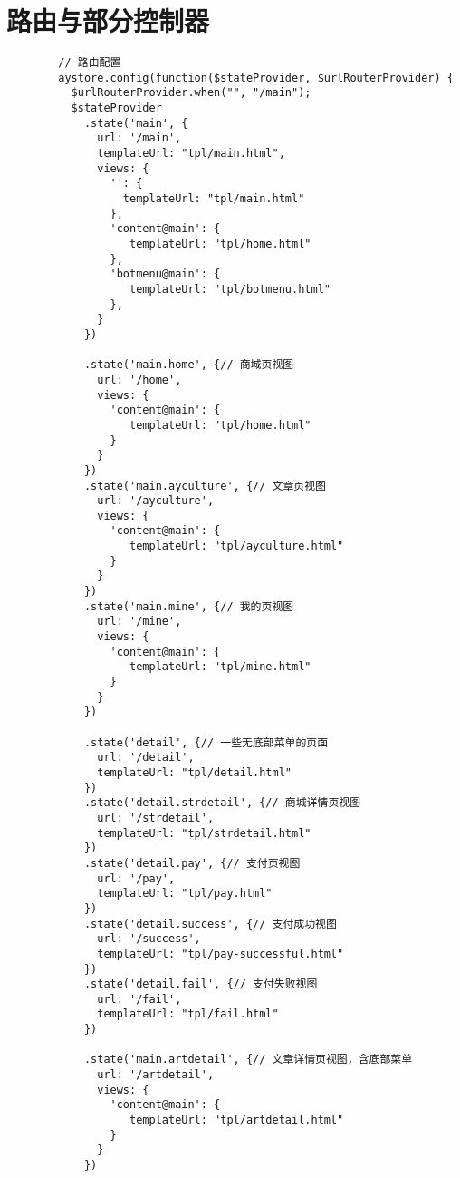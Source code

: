 
\thesisappendix
  \section{路由与部分控制器}
    \label{sec:控制器与路由部分}
      \begin{lstlisting}
        // 路由配置
        aystore.config(function($stateProvider, $urlRouterProvider) {
          $urlRouterProvider.when("", "/main");
          $stateProvider
            .state('main', {
              url: '/main',
              templateUrl: "tpl/main.html",
              views: {
                '': {
                  templateUrl: "tpl/main.html"
                },
                'content@main': {
                   templateUrl: "tpl/home.html"
                },
                'botmenu@main': {
                   templateUrl: "tpl/botmenu.html"
                },
              }
            })

            .state('main.home', {// 商城页视图
              url: '/home',
              views: {
                'content@main': {
                   templateUrl: "tpl/home.html"
                }
              }
            })
            .state('main.ayculture', {// 文章页视图
              url: '/ayculture',
              views: {
                'content@main': {
                   templateUrl: "tpl/ayculture.html"
                }
              }
            })
            .state('main.mine', {// 我的页视图
              url: '/mine',
              views: {
                'content@main': {
                   templateUrl: "tpl/mine.html"
                }
              }
            })

            .state('detail', {// 一些无底部菜单的页面
              url: '/detail',
              templateUrl: "tpl/detail.html"
            })
            .state('detail.strdetail', {// 商城详情页视图
              url: '/strdetail',
              templateUrl: "tpl/strdetail.html"
            })
            .state('detail.pay', {// 支付页视图
              url: '/pay',
              templateUrl: "tpl/pay.html"
            })
            .state('detail.success', {// 支付成功视图
              url: '/success',
              templateUrl: "tpl/pay-successful.html"
            })
            .state('detail.fail', {// 支付失败视图
              url: '/fail',
              templateUrl: "tpl/fail.html"
            })

            .state('main.artdetail', {// 文章详情页视图，含底部菜单
              url: '/artdetail',
              views: {
                'content@main': {
                   templateUrl: "tpl/artdetail.html"
                }
              }
            })


\end{lstlisting}
